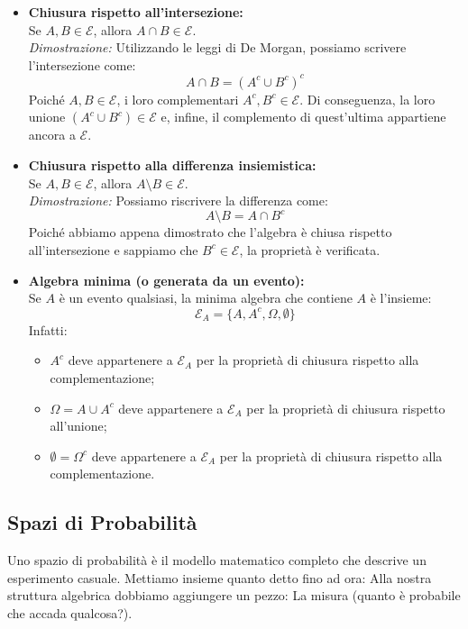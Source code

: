 \begin{itemize}
    \item \textbf{Chiusura rispetto all'intersezione:} \\
    Se $A, B \in \mathcal{E}$, allora $A \cap B \in \mathcal{E}$. \\
    \textit{Dimostrazione:} Utilizzando le leggi di De Morgan, possiamo scrivere l'intersezione come:
    \[ A \cap B = (A^c \cup B^c)^c \]
    Poiché $A, B \in \mathcal{E}$, i loro complementari $A^c, B^c \in \mathcal{E}$. Di conseguenza, la loro unione $(A^c \cup B^c) \in \mathcal{E}$ e, infine, il complemento di quest'ultima appartiene ancora a $\mathcal{E}$.

    \item \textbf{Chiusura rispetto alla differenza insiemistica:} \\
    Se $A, B \in \mathcal{E}$, allora $A \setminus B \in \mathcal{E}$. \\
    \textit{Dimostrazione:} Possiamo riscrivere la differenza come:
    \[ A \setminus B = A \cap B^c \]
    Poiché abbiamo appena dimostrato che l'algebra è chiusa rispetto all'intersezione e sappiamo che $B^c \in \mathcal{E}$, la proprietà è verificata.

    \item \textbf{Algebra minima (o generata da un evento):} \\
    Se $A$ è un evento qualsiasi, la minima algebra che contiene $A$ è l'insieme:
    \[ \mathcal{E}_A = \{A, A^c, \Omega, \emptyset\} \]
    Infatti:
    \begin{itemize}
        \item[$\dagger$] $A^c$ deve appartenere a $\mathcal{E}_A$ per la proprietà di chiusura rispetto alla complementazione;
        \item[$\dagger$] $\Omega = A \cup A^c$ deve appartenere a $\mathcal{E}_A$ per la proprietà di chiusura rispetto all'unione;
        \item[$\dagger$] $\emptyset = \Omega^c$ deve appartenere a $\mathcal{E}_A$ per la proprietà di chiusura rispetto alla complementazione.
    \end{itemize}
\end{itemize}

\subsection{Spazi di Probabilità}
Uno spazio di probabilità è il modello matematico completo che descrive un esperimento casuale.
Mettiamo insieme quanto detto fino ad ora:
Alla nostra struttura algebrica dobbiamo aggiungere un pezzo: La misura (quanto è probabile che accada qualcosa?).

